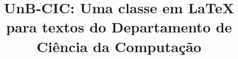 \documentclass[bacharelado]{UnB-CIC}%
\title{UnB-CIC: Uma classe em LaTeX para textos do Departamento de Ciência da Computação}%
\begin{document}
%
    \conteudoPreTextual%

    \textual%


    \postextual%

    \renewcommand{\appendixname}{Anexo}%
    \appendix%
\end{document}
